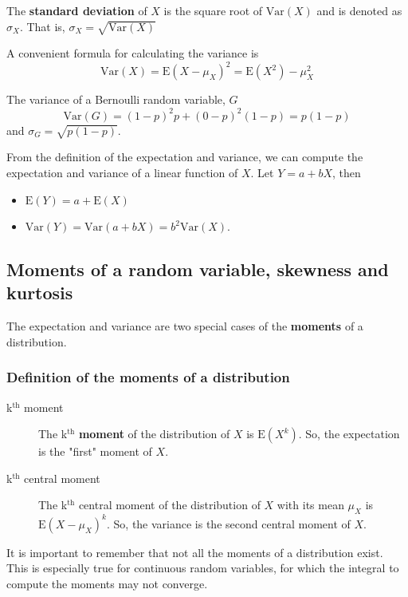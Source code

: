 \documentclass[a4paper,11pt]{article}
\begin{document}
The \textbf{standard deviation} of \(X\) is the square root of
\(\mathrm{Var}(X)\) and is denoted as \(\sigma_{X}\). That is,
\(\sigma_{X} = \sqrt{\mathrm{Var}(X)}\)

A convenient formula for calculating the variance is
\[ \mathrm{Var}(X) = \mathrm{E}(X - \mu_X)^{2} = \mathrm{E}(X^{2}) - \mu_X^{2} \]

The variance of a Bernoulli random variable, \(G\)
\[ \mathrm{Var}(G) = (1-p)^{2}p + (0-p)^{2}(1-p) = p(1-p) \] and \(\sigma_{G} =
\sqrt{p(1-p)}\).

From the definition of the expectation and variance, we can compute
the expectation and variance of a linear function of \(X\). Let \(Y = a +
bX\), then
\begin{itemize}
\item \(\mathrm{E}(Y) = a + \mathrm{E}(X)\)
\item \(\mathrm{Var}(Y) = \mathrm{Var}(a + b X) = b^{2} \mathrm{Var}(X)\).
\end{itemize}


\subsection{Moments of a random variable, skewness and kurtosis}
\label{sec:org9536852}

The expectation and variance are two special cases of the \textbf{moments} of
a distribution.

\subsubsection*{Definition of the moments of a distribution}
\label{sec:orgcab2ee7}

\begin{description}
\item[{k\(^{\text{th}}\) moment}] The k\(^{\text{th}}\) \textbf{moment} of the distribution of \(X\) is
\(\mathrm{E}(X^{k})\). So, the expectation is the "first"
moment of \(X\).

\item[{k\(^{\text{th}}\) central moment}] The k\(^{\text{th}}\) central moment of the distribution
of \(X\) with its mean \(\mu_X\) is \(\mathrm{E}(X - \mu_X)^{k}\). So, the
variance is the second central moment of \(X\).
\end{description}

It is important to remember that not all the moments of a distribution
exist. This is especially true for continuous random variables, for
which the integral to compute the moments may not converge.
\end{document}
